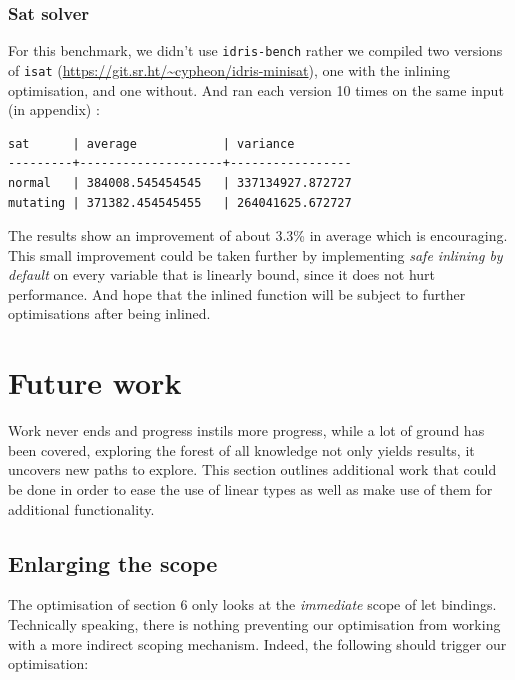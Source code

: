 \documentclass[
]{article}
\begin{document}
\hypertarget{sat-solver}{%
\subsubsection{Sat solver}\label{sat-solver}}

For this benchmark, we didn't use \texttt{idris-bench} rather we
compiled two versions of \texttt{isat}
(\url{https://git.sr.ht/~cypheon/idris-minisat}), one with the inlining
optimisation, and one without. And ran each version 10 times on the same
input (in appendix) :

\begin{verbatim}
sat      | average            | variance
---------+--------------------+-----------------
normal   | 384008.545454545   | 337134927.872727
mutating | 371382.454545455   | 264041625.672727
\end{verbatim}

The results show an improvement of about 3.3\% in average which is
encouraging. This small improvement could be taken further by
implementing \emph{safe inlining by default} on every variable that is
linearly bound, since it does not hurt performance. And hope that the
inlined function will be subject to further optimisations after being
inlined.

\newpage

\hypertarget{future-work}{%
\section{Future work}\label{future-work}}

Work never ends and progress instils more progress, while a lot of
ground has been covered, exploring the forest of all knowledge not only
yields results, it uncovers new paths to explore. This section outlines
additional work that could be done in order to ease the use of linear
types as well as make use of them for additional functionality.

\hypertarget{enlarging-the-scope}{%
\subsection{Enlarging the scope}\label{enlarging-the-scope}}

The optimisation of section 6 only looks at the \emph{immediate} scope
of let bindings. Technically speaking, there is nothing preventing our
optimisation from working with a more indirect scoping mechanism.
Indeed, the following should trigger our optimisation:
\end{document}

